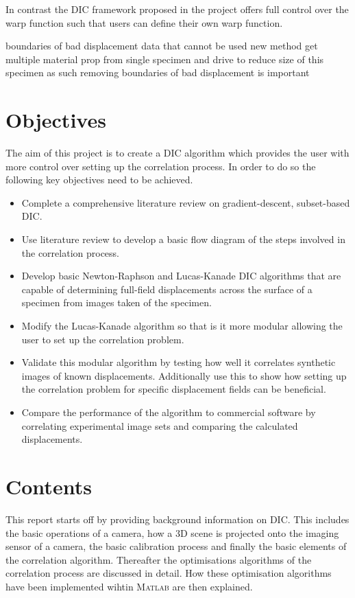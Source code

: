 \documentclass[12pt,oneside,openany,a4paper, %
english, %
masters-t, goldenblock]{usthesis}
\newcommand{\MATLAB}{\textsc{Matlab}\xspace} %
\begin{document}
In contrast the DIC framework proposed in the project offers full control over the warp function such that users can define their own warp function. 


boundaries of bad displacement data that cannot be used
new method get multiple material prop from single specimen and drive to reduce size of this specimen
as such removing boundaries of bad displacement is important





\section{Objectives}
The aim of this project is to create a DIC algorithm which provides the user with more control over setting up the correlation process. In order to do so the following key objectives need to be achieved.
\begin{itemize}
\item Complete a comprehensive literature review on gradient-descent, subset-based DIC.
\item Use literature review to develop a basic flow diagram of the steps involved in the correlation process.
\item Develop basic Newton-Raphson and Lucas-Kanade DIC algorithms that are capable of determining full-field displacements across the surface of a specimen from images taken of the specimen.
\item Modify the Lucas-Kanade algorithm so that is it more modular allowing the user to set up the correlation problem.
\item Validate this modular algorithm by testing how well it correlates synthetic images of known displacements. Additionally use this to show how setting up the correlation problem for specific displacement fields can be beneficial.
\item Compare the performance of the algorithm to commercial software by correlating experimental image sets and comparing the calculated displacements.
\end{itemize}

\section{Contents}
This report starts off by providing background information on DIC. This includes the basic operations of a camera, how a 3D scene is projected onto the imaging sensor of a camera, the basic calibration process and finally the basic elements of the correlation algorithm. Thereafter the optimisations algorithms of the correlation process are discussed in detail. How these optimisation algorithms have been implemented wihtin \MATLAB are then explained. 
\end{document}
